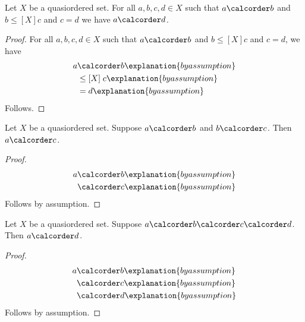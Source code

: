 

\begin{proposition}\label{calculation_generalized_guarded}
    Let $X$ be a quasiordered set.
    For all $a,b,c,d\in X$ such that
        $a\calcorder b$ and $b\mathrel{\leq[X]}c$ and $c=d$
        we have $a\calcorder d$.
\end{proposition}
\begin{proof}
    For all $a,b,c,d\in X$ such that
        $a\calcorder b$ and $b\mathrel{\leq[X]}c$ and $c=d$, we have
    \begin{align*}
        a
            &\calcorder b
                \explanation{by assumption}
                \\
            &\mathrel{\leq[X]} c
                \explanation{by assumption}
                \\
            &= d
                \explanation{by assumption}
    \end{align*}
    Follows.
\end{proof}

\begin{proposition}\label{calculation_generalized_contextual_views}
    Let $X$ be a quasiordered set.
    Suppose $a\calcorder b$ and $b\calcorder c$.
    Then $a\calcorder c$.
\end{proposition}
\begin{proof}
    \begin{align*}
        a &\calcorder b \explanation{by assumption} \\
          &\calcorder c \explanation{by assumption}
    \end{align*}
    Follows by assumption.
\end{proof}

\begin{proposition}\label{calculation_repeated_direct_fold}
    Let $X$ be a quasiordered set.
    Suppose $a\calcorder b\calcorder c\calcorder d$.
    Then $a\calcorder d$.
\end{proposition}
\begin{proof}
    \begin{align*}
        a
            &\calcorder b
                \explanation{by assumption}
                \\
            &\calcorder c
                \explanation{by assumption}
                \\
            &\calcorder d
                \explanation{by assumption}
    \end{align*}
    Follows by assumption.
\end{proof}
